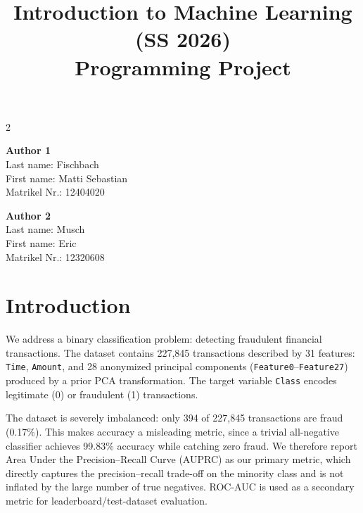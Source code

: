 \documentclass[a4, 10 pt, conference]{ieeeconf}
\title{\LARGE \bf
Introduction to Machine Learning (SS 2026)\\ Programming Project
\vspace{-3em}
}
\begin{document}
\maketitle
\vspace{-3em}
\thispagestyle{empty}
\pagestyle{empty}

\begin{strip}
\begin{tcolorbox}[
size=tight,
colback=white,
boxrule=0.2mm,
left=3mm,right=3mm, top=3mm, bottom=1mm
]
{\begin{multicols}{2}

\textbf{Author 1}           \\
Last name: Fischbach        \\
First name: Matti Sebastian \\
Matrikel Nr.: 12404020

\columnbreak

\textbf{Author 2} \\
Last name: Musch  \\
First name: Eric  \\
Matrikel Nr.: 12320608

\end{multicols}}
\end{tcolorbox}
\end{strip}


\section{Introduction}
\label{sec:intro}

We address a binary classification problem: detecting fraudulent financial
transactions. The dataset contains 227{,}845 transactions described by 31
features: \texttt{Time}, \texttt{Amount}, and 28 anonymized principal
components (\texttt{Feature0}–\texttt{Feature27}) produced by a prior PCA
transformation. The target variable \texttt{Class} encodes legitimate (0) or
fraudulent (1) transactions.

The dataset is severely imbalanced: only 394 of 227{,}845 transactions are
fraud (0.17\%). This makes accuracy a misleading metric, since a trivial
all-negative classifier achieves 99.83\% accuracy while catching zero fraud.
We therefore report Area Under the Precision–Recall Curve (AUPRC) as our
primary metric, which directly captures the precision–recall trade-off on the
minority class and is not inflated by the large number of true negatives.
ROC-AUC is used as a secondary metric for leaderboard/test-dataset evaluation.
\end{document}
